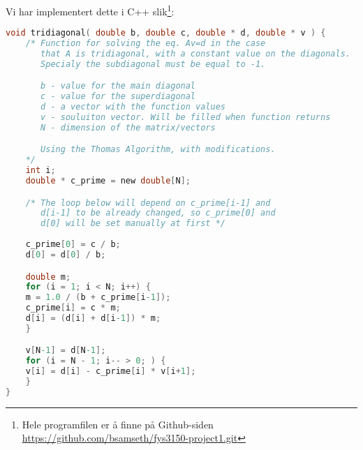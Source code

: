 \documentclass[11pt]{article}
\numberwithin{figure}{section} %
\numberwithin{table}{section} %
\begin{document}
Vi har implementert dette i C++ slik\footnote{Hele programfilen er å
  finne på Github-siden \url{https://github.com/bsamseth/fys3150-project1.git}}:
\begin{lstlisting}[language=C]
void tridiagonal( double b, double c, double * d, double * v ) {
    /* Function for solving the eq. Av=d in the case 
       that A is tridiagonal, with a constant value on the diagonals.
       Specialy the subdiagonal must be equal to -1.

       b - value for the main diagonal
       c - value for the superdiagonal
       d - a vector with the function values
       v - souluiton vector. Will be filled when function returns
       N - dimension of the matrix/vectors

       Using the Thomas Algorithm, with modifications.
    */
    int i;
    double * c_prime = new double[N];

    /* The loop below will depend on c_prime[i-1] and 
       d[i-1] to be already changed, so c_prime[0] and 
       d[0] will be set manually at first */
    
    c_prime[0] = c / b;
    d[0] = d[0] / b;

    double m;
    for (i = 1; i < N; i++) {
	m = 1.0 / (b + c_prime[i-1]);
	c_prime[i] = c * m;
	d[i] = (d[i] + d[i-1]) * m;
    }

    v[N-1] = d[N-1];
    for (i = N - 1; i-- > 0; ) {
	v[i] = d[i] - c_prime[i] * v[i+1];
    }
}
\end{lstlisting}
\end{document}
